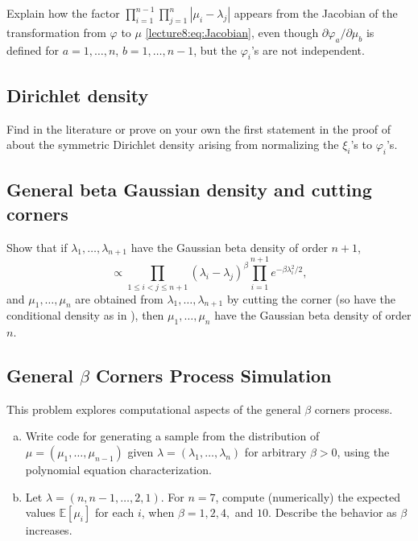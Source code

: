 \documentclass[letterpaper,11pt,oneside,reqno]{book}
\numberwithin{equation}{chapter}  %
\theoremstyle{definition}
\begin{document}
Explain how the factor $\prod_{i=1}^{n-1}\prod_{j=1}^n|\mu_i-\lambda_j|$
appears from the Jacobian of the transformation from $\varphi$ to $\mu$
\eqref{lecture8:eq:Jacobian},
even though $\partial\varphi_a/\partial\mu_b$ is defined for
$a=1,\ldots,n  $, $b=1,\ldots,n-1$,
but the $\varphi_i$'s are not independent.

\subsection{Dirichlet density}
\label{lecture8:prob:dirichlet}

Find in the literature or prove on your own
the first statement in the proof of
 about the symmetric Dirichlet density arising from
normalizing the $\xi_i$'s to $\varphi_i$'s.

\subsection{General beta Gaussian density and cutting corners}

Show that if $\lambda_1,\ldots,\lambda_{n+1} $ have the Gaussian beta density of order $n+1$,
\begin{equation*}
	\propto \prod_{1\le i<j\le n+1}(\lambda_i-\lambda_j)^{\beta} \prod_{i=1}^{n+1}e^{-\beta\lambda_i^2/2},
\end{equation*}
and $\mu_1,\ldots,\mu_n $ are obtained from $\lambda_1,\ldots,\lambda_{n+1}$
by cutting the corner (so have the conditional density as in ),
then $\mu_1,\ldots,\mu_n$ have the Gaussian beta density of order $n$.

\subsection{General $\beta$ Corners Process Simulation}
\label{lecture8:prob:corners_simulation}

This problem explores computational aspects of the general $\beta$ corners process.

\begin{enumerate}[(a)]
\item Write code for generating a sample from the distribution of $\mu = (\mu_1, \ldots, \mu_{n-1})$ given $\lambda = (\lambda_1, \ldots, \lambda_n)$ for arbitrary $\beta > 0$, using the polynomial equation characterization.

\item Let $\lambda = (n, n-1, \ldots, 2, 1)$. For $n = 7$, compute (numerically) the expected values $\mathbb{E}[\mu_i]$ for each $i$, when $\beta = 1, 2, 4,$ and $10$. Describe the behavior as $\beta$ increases.
\end{enumerate}
\end{document}
